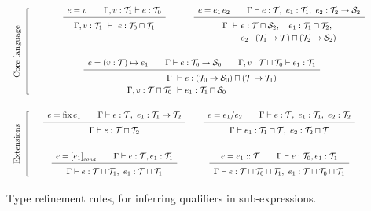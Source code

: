 \begin{figure*}
\newcommand\typerule[2]{{\renewcommand\arraystretch{1.5}\begin{array}[t]{c} #1 \\ \hline #2 \end{array}}}
\[
\renewcommand\arraystretch{3}
\begin{array}{cccp{1cm}}
  \multirow{2}{1cm}[-2em]{\begin{tikzpicture}\draw (0,0) -- ++(-1mm,0) -- ++(0,-10.2em) {} node[midway,anchor=base,xshift=-3mm,rotate=90] {Core language} -- ++(1mm,0);\end{tikzpicture}} &
  \typerule{e=v \qquad \Gamma,v:\T_1\vdash e:\T_0}
           {\Gamma,v:\T_1 ~\vdash~ e:\T_0\sqcap\T_1} &
  \typerule{e=e_1\,e_2 \qquad \Gamma \vdash e:\T, ~ e_1:\T_1, ~ e_2:\T_2\to\S_2}
           {\renewcommand\arraystretch{1.2}
            \begin{array}[t]{@{}l@{}l@{}}
              \Gamma ~\vdash~ & e:\T\sqcap\S_2,  \quad
                                e_1:\T_1\sqcap\T_2, \\
                              & e_2:(\T_1\to\T)\sqcap(\T_2\to\S_2)
            \end{array}} & \\
  &
  \cspan2{
  \typerule{e=(v:\T)\mapsto e_1 \qquad \Gamma\vdash e:\T_0\to\S_0 \qquad \Gamma,v:\T\sqcap\T_0\vdash e_1:\T_1}
           {\renewcommand\arraystretch{1.2}
            \begin{array}[t]{r@{}l}
              \Gamma ~\vdash~ & e:(\T_0\to\S_0)\sqcap(\T\to\T_1)\\
              \Gamma,v:\T\sqcap\T_0 ~\vdash~ & e_1:\T_1\sqcap\S_0 
            \end{array}}  } & \\
  \multirow{2}{1cm}[-1.8em]{\begin{tikzpicture}\draw (0,0) -- ++(-1mm,0) -- ++(0,-7.7em) node[midway,anchor=base,xshift=-3mm,rotate=90] {Extensions} -- ++(1mm,0);\end{tikzpicture}} &
  \typerule{e=\fix e_1 \qquad \Gamma\vdash e:\T, ~ e_1:\T_1\to\T_2}          %
           {\Gamma\vdash e: \T\sqcap\T_2} &
  \typerule{e=e_1/e_2 \qquad \Gamma\vdash e:\T, ~ e_1:\T_1, ~ e_2:\T_2}      %
           {\renewcommand\arraystretch{1.2}
            \begin{array}[t]{@{}l@{}l@{}}
              \Gamma\vdash{} & e_1:\T_1\sqcap\T, ~ e_2:\T_2\sqcap\T
            \end{array}} & \\
  &
  \typerule{e=[e_1]_{_{cond}} \qquad \Gamma\vdash e:\T,e_1:\T_1}                           %
           {\Gamma\vdash e:\T\sqcap\T_1, ~ e_1:\T\sqcap\T_1} &
  \typerule{e=e_1::\T \qquad \Gamma\vdash e:\T_0,e_1:\T_1}                           %
           {\Gamma\vdash e:\T\sqcap\T_0\sqcap\T_1, ~ e_1:\T\sqcap\T_0\sqcap\T_1}
\end{array}
\]
\caption{\label{lang:type refinement rules}
  Type refinement rules, for inferring qualifiers in sub-expressions.}
\end{figure*}

